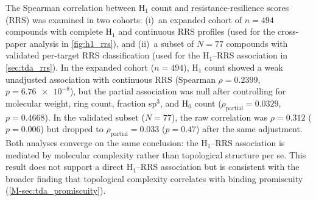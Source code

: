 \documentclass[11pt,a4paper]{article}
\begin{document}
The Spearman correlation between H$_1$ count and resistance-resilience scores (RRS) \citep{temgoua2027md} was examined in two cohorts: (i)~an expanded cohort of $n = \num{494}$ compounds with complete H$_1$ and continuous RRS profiles (used for the cross-paper analysis in \cref{fig:h1_rrs}), and (ii)~a subset of $N = \num{77}$ compounds with validated per-target RRS classification (used for the H$_1$--RRS association in \cref{sec:tda_rrs}). In the expanded cohort ($n = \num{494}$), H$_1$ count showed a weak unadjusted association with continuous RRS (Spearman $\rho = \num{0.2399}$, $p = \num{6.76e-8}$), but the partial association was null after controlling for molecular weight, ring count, fraction sp$^3$, and H$_0$ count ($\rho_{\text{partial}} = \num{0.0329}$, $p = \num{0.4668}$). In the validated subset ($N = \num{77}$), the raw correlation was $\rho = \num{0.312}$ ($p = \num{0.006}$) but dropped to $\rho_{\text{partial}} = \num{0.033}$ ($p = \num{0.47}$) after the same adjustment. Both analyses converge on the same conclusion: the H$_1$--RRS association is mediated by molecular complexity rather than topological structure per se. This result does not support a direct H$_1$--RRS association but is consistent with the broader finding that topological complexity correlates with binding promiscuity (\cref{M-sec:tda_promiscuity}).



\end{document}

